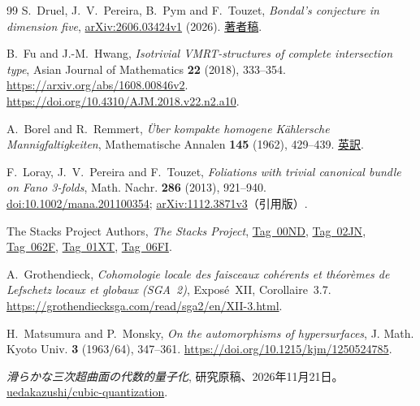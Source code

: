 \begin{thebibliography}{99}
S.~Druel, J.~V.~Pereira, B.~Pym and F.~Touzet,
\emph{Bondal's conjecture in dimension five},
\href{https://arxiv.org/abs/2606.03424v1}{arXiv:2606.03424v1} (2026).
\href{https://druel.perso.math.cnrs.fr/textes/bondal5d.pdf}{著者稿}.

B.~Fu and J.-M.~Hwang,
\emph{Isotrivial VMRT-structures of complete intersection type},
Asian Journal of Mathematics \textbf{22} (2018), 333--354.
\url{https://arxiv.org/abs/1608.00846v2}.
\url{https://doi.org/10.4310/AJM.2018.v22.n2.a10}.

A.~Borel and R.~Remmert,
\emph{\"Uber kompakte homogene K\"ahlersche Mannigfaltigkeiten},
Mathematische Annalen \textbf{145} (1962), 429--439.
\href{https://wglobke.github.io/publications/BorelRemmert1962.pdf}{英訳}.

F.~Loray, J.~V.~Pereira and F.~Touzet,
\emph{Foliations with trivial canonical bundle on Fano 3-folds},
Math. Nachr. \textbf{286} (2013), 921--940.
\href{https://doi.org/10.1002/mana.201100354}{doi:10.1002/mana.201100354};
\href{https://arxiv.org/abs/1112.3871v3}{arXiv:1112.3871v3}（引用版）.

The Stacks Project Authors,
\emph{The Stacks Project},
\href{https://stacks.math.columbia.edu/tag/00ND}{Tag~00ND},
\href{https://stacks.math.columbia.edu/tag/02JN}{Tag~02JN},
\href{https://stacks.math.columbia.edu/tag/062F}{Tag~062F},
\href{https://stacks.math.columbia.edu/tag/01XT}{Tag~01XT},
\href{https://stacks.math.columbia.edu/tag/06FI}{Tag~06FI}.

A.~Grothendieck,
\emph{Cohomologie locale des faisceaux coh\'erents et th\'eor\`emes
de Lefschetz locaux et globaux (SGA~2)},
Expos\'e~XII, Corollaire~3.7.
\url{https://grothendiecksga.com/read/sga2/en/XII-3.html}.

H.~Matsumura and P.~Monsky,
\emph{On the automorphisms of hypersurfaces},
J. Math. Kyoto Univ. \textbf{3} (1963/64), 347--361.
\url{https://doi.org/10.1215/kjm/1250524785}.

\emph{滑らかな三次超曲面の代数的量子化},
研究原稿、2026年11月21日。
\href{https://github.com/uedakazushi/cubic-quantization/blob/main/papers/cubic-quantization.tex}{uedakazushi/cubic-quantization}.
\end{thebibliography}
